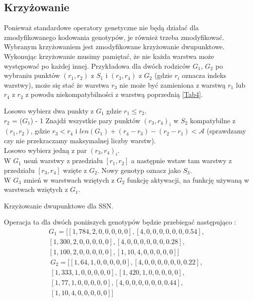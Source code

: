 \documentclass{article}
\begin{document}
\subsection{Krzyżowanie}
Ponieważ standardowe operatory genetyczne nie będą działać dla zmodyfikowanego kodowania
genotypów, je również trzeba zmodyfikować. Wybranym krzyżowaniem jest zmodyfikowane krzyżowanie
dwupunktowe. Wykonując krzyżowanie musimy pamiętać, że nie każda warstwa może występować po 
każdej innej. Przykładowa dla dwóch rodziców $G_1$, $G_2$ po wybraniu punktów $(r_1, r_2)$ z 
$S_1$ i $(r_3, r_4)$ z $G_2$ (gdzie $r_i$ oznacza indeks warstwy), może się stać że warstwa
$r_3$ nie może być zamieniona z warstwą $r_1$ lub $r_4$ z $r_2$ z powodu niekompatybilności
z warstwą poprzednią [\hyperref[tab:rules]{Tab4}].\\
\begin{algorithm}[H]
	Losowo wybierz dwa punkty z $G_1$ gdzie $r_1 \leq r_2$.\\
	 {
		$r_2$ = ($G_1$) - 1
	}
	Znajdź wszystkie pary punktów $(r_3, r_4)_i$ w $S_2$ kompatybilne z $(r_1, r_2)$,
	gdzie $r_3 < r_4$ i $len(G_1) + (r_4 - r_3) - (r_2 - r_1) < \mathcal{A}$
	(sprawdzamy czy nie przekraczamy maksymalnej liczby warstw).\\
	Losowo wybierz jedną z par $(r_3, r_4)_i$.\\
	W $G_1$ usuń warstwy z przedziału $[r_1, r_2]$ a następnie wstaw tam
	warstwy z przedziału $[r_3, r_4]$ wzięte z $G_2$. Nowy genotyp oznacz jako $S_3$.\\
	W $G_3$ zmień w warstwach wziętych z $G_2$ funkcję aktywacji, na funkcję 
	używaną w warstwach wziętych z  $G_1$.
	\caption{Krzyżowanie dwupunktowe dla SSN.}
\end{algorithm}
Operacja ta dla dwóch poniższych genotypów będzie przebiegać następująco \cite{ams}:\\
\begin{align*}
	G_1 = \big[[1, 784, 2, 0, 0, 0, 0, 0], [4, 0, 0, 0, 0, 0, 0, 0.54],\\ 
	            [1, 300, 2, 0, 0, 0, 0, 0], [4, 0, 0, 0, 0, 0, 0, 0.28],\\
		    [1, 100, 2, 0, 0, 0, 0, 0], [1, 10, 4, 0, 0, 0, 0, 0]\big]
\end{align*}
\begin{align*}
	G_2 = \big[[1, 64, 1, 0, 0, 0, 0, 0], [4, 0, 0, 0, 0, 0, 0, 0.22],\\
		    [1, 333, 1, 0, 0, 0, 0, 0], [1, 420, 1, 0, 0, 0, 0, 0],\\
		    [1, 77, 1, 0, 0, 0, 0, 0], [4, 0, 0, 0, 0, 0, 0, 0.44],\\
		    [1, 10, 4, 0, 0, 0, 0, 0]\big]
\end{align*}
\end{document}
